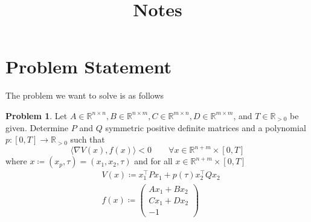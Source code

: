 \documentclass[a4paper,12pt,english]{amsart}
\title{Notes}
\newcommand\mbb{\mathbb}
\newcommand\RR{\mbb{R}}
\numberwithin{equation}{section}
\theoremstyle{remark}
\theoremstyle{plain}
\theoremstyle{definition}
\newtheorem{problem}{Problem}
\begin{document}
\maketitle

\section{Problem Statement}
The problem we want to solve is as follows
\begin{problem}
Let $A\in\RR^{n\times n}, B\in\RR^{n\times m}, C\in\RR^{m\times n}, D\in\RR^{m\times m}$, and $T\in\RR_{>0}$ be given. Determine $P$ and $Q$ symmetric positive definite matrices and a polynomial $p\colon[0,T]\rightarrow\RR_{>0}$ such that
$$
\langle\nabla V(x),f(x)\rangle<0\qquad \forall x\in\RR^{n+m}\times[0,T]
$$
where $x\coloneqq (x_p,\tau)=(x_1, x_2, \tau)$ and for all $x\in\RR^{n+m}\times[0,T]$
$$
\begin{aligned}
&V(x)\coloneqq x_1^\top P x_1+p(\tau)x_2^\top Q x_2\\
&f(x)\coloneqq 
\begin{pmatrix} 
Ax_1+B x_2\\
Cx_1+D x_2\\
-1
\end{pmatrix}
\end{aligned}
$$
\end{problem}
\end{document}
